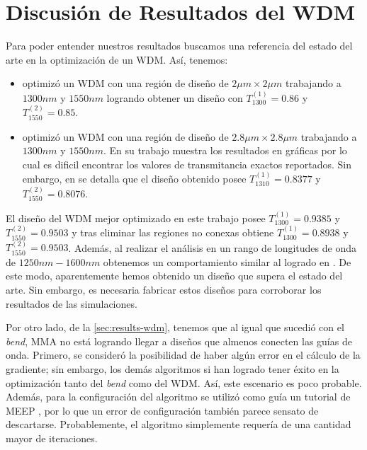 \section{Discusión de Resultados del WDM}

Para poder entender nuestros resultados buscamos una referencia del estado del arte en la optimización
de un WDM. Así, tenemos:

\begin{itemize}
  \item \cite{Christiansen2021} optimizó un WDM con una región
  de diseño de $2 \mu m \times 2 \mu m$ trabajando a $1300 nm$ y $1550 nm$ logrando obtener un diseño
  con $T_{1300}^{(1)} = 0.86$ y $T_{1550}^{(2)} = 0.85$.

  \item \cite{Piggott2015} optimizó un WDM con una región de diseño de $2.8 \mu m \times 2.8 \mu m$
    trabajando a $1300 nm$ y $1550 nm$. En su trabajo muestra los resultados en gráficas por lo cual
    es dificil encontrar los valores de transmitancia exactos reportados. Sin embargo, en
    \cite{Sigmund2016} se detalla que el diseño obtenido posee 
    $T_{1310}^{(1)} = 0.8377$ y $T_{1550}^{(2)} = 0.8076$.
\end{itemize}

El diseño del WDM mejor optimizado en este trabajo posee $T_{1300}^{(1)} = 0.9385$ y 
$T_{1550}^{(2)} = 0.9503$ y tras eliminar las regiones no conexas obtiene
$T_{1300}^{(1)} = 0.8938$ y $T_{1550}^{(2)} = 0.9503$. Además, al realizar el análisis
en un rango de longitudes de onda de $1250nm-1600nm$ obtenemos un comportamiento similar
al logrado en \cite{Piggott2015}.
De este modo, aparentemente hemos obtenido un diseño que supera el estado del arte.
Sin embargo, es necesaria fabricar estos diseños para corroborar los resultados de las simulaciones.

Por otro lado, de la \autoref{sec:results-wdm}, tenemos que al igual que sucedió con el \emph{bend},
MMA no está logrando llegar a diseños que almenos conecten las guías de onda.
Primero, se consideró la posibilidad de haber algún error en el cálculo de la gradiente;
sin embargo, los demás algoritmos si han logrado tener éxito en la optimización tanto del \emph{bend}
como del WDM. Así, este escenario es poco probable.
Además, para la configuración del algoritmo se utilizó como guía un tutorial de MEEP \citep{Oskooi2010},
por lo que un error de configuración también parece sensato de descartarse.
Probablemente, el algoritmo simplemente requería de una cantidad mayor de iteraciones.


